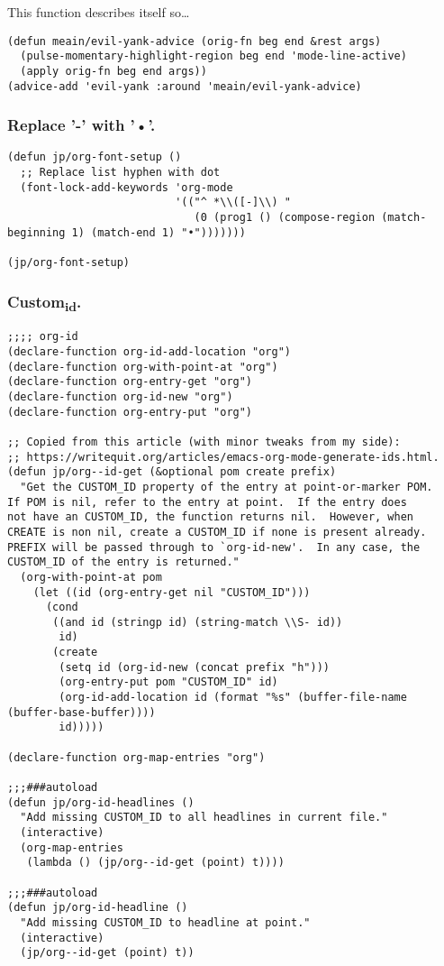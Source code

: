 \documentclass[11pt]{article}
\begin{document}
This function describes itself so\ldots{}
\begin{verbatim}
(defun meain/evil-yank-advice (orig-fn beg end &rest args)
  (pulse-momentary-highlight-region beg end 'mode-line-active)
  (apply orig-fn beg end args))
(advice-add 'evil-yank :around 'meain/evil-yank-advice)
\end{verbatim}
\subsubsection{Replace '-' with '•'.}
\label{sec:orgce8c542}
\begin{verbatim}
(defun jp/org-font-setup ()
  ;; Replace list hyphen with dot
  (font-lock-add-keywords 'org-mode
                          '(("^ *\\([-]\\) "
                             (0 (prog1 () (compose-region (match-beginning 1) (match-end 1) "•")))))))

(jp/org-font-setup)
\end{verbatim}
\subsubsection{Custom\textsubscript{id}.}
\label{sec:orgd7d8924}
\begin{verbatim}
;;;; org-id
(declare-function org-id-add-location "org")
(declare-function org-with-point-at "org")
(declare-function org-entry-get "org")
(declare-function org-id-new "org")
(declare-function org-entry-put "org")

;; Copied from this article (with minor tweaks from my side):
;; https://writequit.org/articles/emacs-org-mode-generate-ids.html.
(defun jp/org--id-get (&optional pom create prefix)
  "Get the CUSTOM_ID property of the entry at point-or-marker POM.
If POM is nil, refer to the entry at point.  If the entry does
not have an CUSTOM_ID, the function returns nil.  However, when
CREATE is non nil, create a CUSTOM_ID if none is present already.
PREFIX will be passed through to `org-id-new'.  In any case, the
CUSTOM_ID of the entry is returned."
  (org-with-point-at pom
    (let ((id (org-entry-get nil "CUSTOM_ID")))
      (cond
       ((and id (stringp id) (string-match \\S- id))
        id)
       (create
        (setq id (org-id-new (concat prefix "h")))
        (org-entry-put pom "CUSTOM_ID" id)
        (org-id-add-location id (format "%s" (buffer-file-name (buffer-base-buffer))))
        id)))))

(declare-function org-map-entries "org")

;;;###autoload
(defun jp/org-id-headlines ()
  "Add missing CUSTOM_ID to all headlines in current file."
  (interactive)
  (org-map-entries
   (lambda () (jp/org--id-get (point) t))))

;;;###autoload
(defun jp/org-id-headline ()
  "Add missing CUSTOM_ID to headline at point."
  (interactive)
  (jp/org--id-get (point) t))
\end{verbatim}
\end{document}
